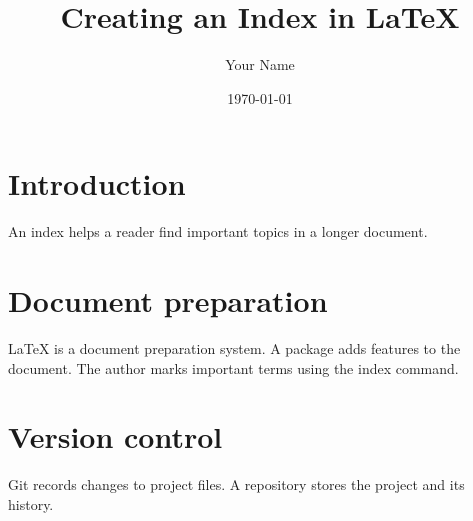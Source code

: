 \documentclass[11pt,a4paper]{article}
\title{Creating an Index in LaTeX}
\author{Your Name}
\date{\today}
\begin{document}
\maketitle

\section{Introduction}
An index helps a reader find important topics in a longer document.

\section{Document preparation}
LaTeX is a document preparation system. A package adds features to the document. The author marks important terms using the index command.

\section{Version control}
Git records changes to project files. A repository stores the project and its history.

\printindex
\end{document}
